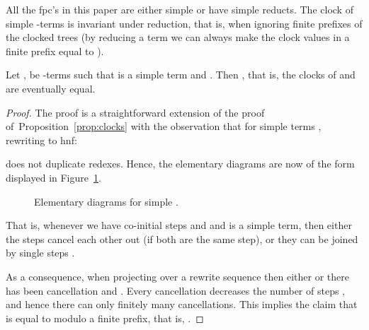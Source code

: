All the fpc's in this paper are either simple or have simple reducts.
The clock of simple -terms is invariant under reduction,
that is, when ignoring finite prefixes of the clocked \bohm{} trees
(by reducing a term we can always make the clock values
in a finite prefix equal to ).
\begin{proposition}\label{prop:simple}
  Let ,  be -terms such that  is a simple term and .
  Then , that is, the clocks of  and  are eventually equal.
\end{proposition}
\begin{proof}
  The proof is a straightforward extension of the proof of~Proposition~\ref{prop:clocks}
  with the observation that for simple terms ,
  rewriting  to hnf:
   
  does not duplicate redexes.
  Hence, the elementary diagrams
  are now of the form displayed in Figure~\ref{fig:elementary:diagram:simple}.
  \begin{figure}[ht!]
  \begin{center}
  \vspace{-2ex}
  \caption{Elementary diagrams for simple .}
  \vspace{-2ex}
  \label{fig:elementary:diagram:simple}
  \end{center}
  \end{figure}
  
  That is, whenever we have co-initial steps  and 
  and  is a simple term,
  then either the steps cancel each other out  (if both are the same step),
  or they can be joined by single steps .

  As a consequence, when projecting  over a rewrite sequence 
  then either  or
  there has been cancellation and .
  Every cancellation decreases the number of steps ,
  and hence there can only finitely many cancellations.
  This implies the claim that  is equal to 
  modulo a finite prefix, that is, .
\end{proof}

